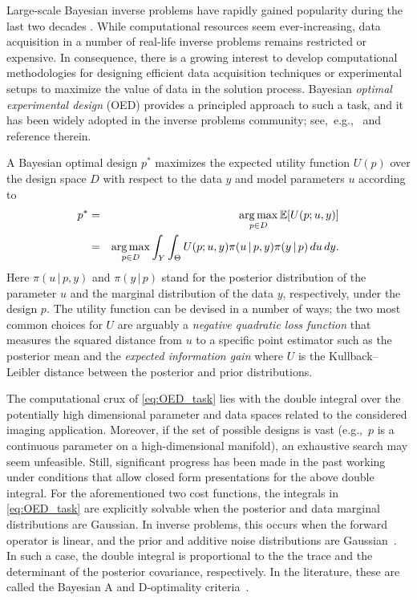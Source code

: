 \documentclass[final]{siamltex}
\newcommand{\E}{\mathbb{E}}
\DeclareMathOperator{\argmax}{\rm arg\, max}
\begin{document}
Large-scale Bayesian inverse problems have rapidly gained popularity during the last two decades \cite{Kaipio06, stuart_2010}. While computational resources seem ever-increasing, data acquisition in a number of real-life inverse problems remains restricted or expensive. In consequence, there is a growing interest to develop computational methodologies for designing efficient data acquisition techniques or experimental setups to maximize the value of data in the solution process. Bayesian {\em optimal experimental design} (OED) provides a principled approach to such a task, and it has been widely adopted in the inverse problems community; see,~e.g.,~\cite{alexanderian2021optimal_review} and reference therein.

A Bayesian optimal design $p^*$ maximizes the expected utility function $U(p)$ over the design space $D$ with respect to the data $y$ and model parameters $u$ according to
\begin{eqnarray}
	\label{eq:OED_task}
	p^* & = & \underset{p\in D}{\argmax} \, \E[U(p; u,y)] \nonumber \\
	& = & \underset{p\in D}{\argmax} \int_Y \int_\Theta U(p; u, y) \pi(u \, | \, p, y) \pi(y \, | \, p) \, d u \, dy.
\end{eqnarray}
Here $\pi(u \, | \, p, y)$ and $\pi(y \, | \, p)$ stand for the posterior distribution of the parameter $u$ and the marginal distribution of the data $y$, respectively, under the design $p$. The utility function can be devised in a number of ways; the two most common choices for $U$ are arguably a \emph{negative quadratic loss function} that measures the squared distance from $u$ to a specific point estimator such as the posterior mean and the \emph{expected information gain} where $U$ is the Kullback--Leibler distance between the posterior and prior distributions.

The computational crux of \eqref{eq:OED_task} lies with the double integral over the potentially high dimensional parameter and data spaces related to the considered imaging application. Moreover, if the set of possible designs is vast (e.g.,~$p$ is a continuous parameter on a high-dimensional manifold), an exhaustive search may seem unfeasible. Still, significant progress has been made in the past working under conditions that allow closed form presentations for the above double integral. For the aforementioned two cost functions, the integrals in \eqref{eq:OED_task} are explicitly solvable when the posterior and data marginal distributions are Gaussian. In inverse problems, this occurs when the forward operator is linear, and the prior and additive noise distributions are Gaussian~\cite{Kaipio06}. In such a case, the double integral is proportional to the
the trace and the determinant of the posterior covariance, respectively.
In the literature, these are called the Bayesian A and D-optimality criteria~\cite{chaloner1995bayesian}.
\end{document}
